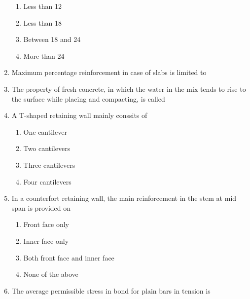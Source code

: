 \documentclass[11pt,a4paper]{article}
\begin{document}
\begin{enumerate}
\begin{enumerate}[label=\Alph*.]
\item{Less than 12}
\item{Less than 18}
\item{Between 18 and 24}
\item{More than 24}
\end{enumerate}
\item{Maximum percentage reinforcement in case of slabs is limited to}
\\
\item{The property of fresh concrete, in which the water in the mix tends to rise to the surface while placing and compacting, is called}
\\
\item{A T-shaped retaining wall mainly conssits of}
\begin{enumerate}[label=\Alph*.]
\item{One cantilever}
\item{Two cantilevers}
\item{Three cantilevers}
\item{Four cantilevers}
\end{enumerate}
\item{In a counterfort retaining wall, the main reinforcement in the stem at mid span is provided on}
\begin{enumerate}[label=\Alph*.]
\item{Front face only}
\item{Inner face only}
\item{Both front face and inner face}
\item{None of the above}
\end{enumerate}
\item{The average permissible stress in bond for plain bars in tension is}
\begin{enumerate}[label=\Alph*.]

\end{enumerate}
\end{enumerate}
\end{document}
